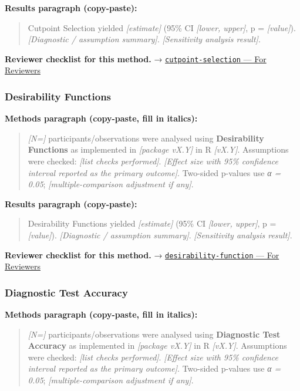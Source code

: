 \documentclass[
]{article}
\begin{document}
\textbf{Results paragraph (copy-paste):}

\begin{quote}
Cutpoint Selection yielded \emph{{[}estimate{]}} (95\% CI
\emph{{[}lower, upper{]}}, p = \emph{{[}value{]}}). \emph{{[}Diagnostic
/ assumption summary{]}}. \emph{{[}Sensitivity analysis result{]}}.
\end{quote}

\textbf{Reviewer checklist for this method.} →
\href{../chapters/14-clinical/cutpoint-selection.Rmd\#for-reviewers}{\texttt{cutpoint-selection}
--- For Reviewers}

\subsubsection{Desirability Functions}\label{desirability-functions}

\textbf{Methods paragraph (copy-paste, fill in italics):}

\begin{quote}
\emph{{[}N={]}} participants/observations were analysed using
\textbf{Desirability Functions} as implemented in \emph{{[}package
vX.Y{]}} in R \emph{{[}vX.Y{]}}. Assumptions were checked: \emph{{[}list
checks performed{]}}. \emph{{[}Effect size with 95\% confidence interval
reported as the primary outcome{]}}. Two-sided p-values use \emph{α =
0.05}; \emph{{[}multiple-comparison adjustment if any{]}}.
\end{quote}

\textbf{Results paragraph (copy-paste):}

\begin{quote}
Desirability Functions yielded \emph{{[}estimate{]}} (95\% CI
\emph{{[}lower, upper{]}}, p = \emph{{[}value{]}}). \emph{{[}Diagnostic
/ assumption summary{]}}. \emph{{[}Sensitivity analysis result{]}}.
\end{quote}

\textbf{Reviewer checklist for this method.} →
\href{../chapters/16-design/desirability-function.Rmd\#for-reviewers}{\texttt{desirability-function}
--- For Reviewers}

\subsubsection{Diagnostic Test Accuracy}\label{diagnostic-test-accuracy}

\textbf{Methods paragraph (copy-paste, fill in italics):}

\begin{quote}
\emph{{[}N={]}} participants/observations were analysed using
\textbf{Diagnostic Test Accuracy} as implemented in \emph{{[}package
vX.Y{]}} in R \emph{{[}vX.Y{]}}. Assumptions were checked: \emph{{[}list
checks performed{]}}. \emph{{[}Effect size with 95\% confidence interval
reported as the primary outcome{]}}. Two-sided p-values use \emph{α =
0.05}; \emph{{[}multiple-comparison adjustment if any{]}}.
\end{quote}
\end{document}
